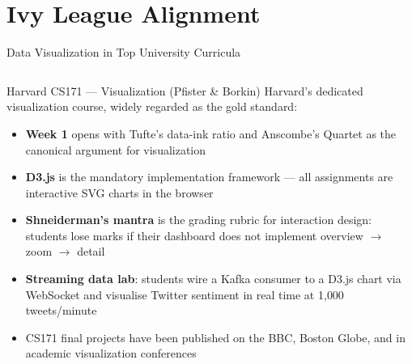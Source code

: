 \documentclass[aspectratio=169,10pt]{beamer}
\begin{document}
\section{Ivy League Alignment}

\begin{frame}{Data Visualization in Top University Curricula}
  \begin{columns}[T]
      \begin{block}{Harvard CS171 — Visualization (Pfister \& Borkin)}
        \small Harvard's dedicated visualization course, widely regarded as the gold standard:
        \begin{itemize}
          \item \textbf{Week 1} opens with Tufte's data-ink ratio and Anscombe's Quartet as the canonical argument for visualization
          \item \textbf{D3.js} is the mandatory implementation framework --- all assignments are interactive SVG charts in the browser
          \item \textbf{Shneiderman's mantra} is the grading rubric for interaction design: students lose marks if their dashboard does not implement overview $\to$ zoom $\to$ detail
          \item \textbf{Streaming data lab}: students wire a Kafka consumer to a D3.js chart via WebSocket and visualise Twitter sentiment in real time at 1{,}000 tweets/minute
          \item CS171 final projects have been published on the BBC, Boston Globe, and in academic visualization conferences
        \end{itemize}
      \end{block}


\end{columns}
\end{frame}
\end{document}
